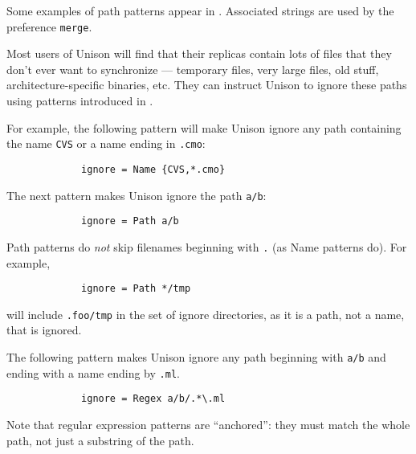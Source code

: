 \documentclass{article}
\begin{document}
Some examples of path patterns appear in .
Associated strings are used by the preference \texttt{merge}.


Most users of Unison will find that their replicas contain lots of
files that they don't ever want to synchronize --- temporary files,
very large files, old stuff, architecture-specific binaries, etc.
They can instruct Unison to ignore these paths using patterns
introduced in .

For example, the following pattern will make Unison ignore any
path containing the name \verb|CVS| or a name ending in \verb|.cmo|:
\begin{verbatim}
             ignore = Name {CVS,*.cmo}
\end{verbatim}
The next pattern makes Unison ignore the path \verb|a/b|:
\begin{verbatim}
             ignore = Path a/b
\end{verbatim}
Path patterns do {\em not} skip filenames beginning with \verb|.| (as Name
patterns do).  For example,
\begin{verbatim}
             ignore = Path */tmp
\end{verbatim}
will include \verb|.foo/tmp| in the set of ignore directories, as it is a
path, not a name, that is ignored.

The following pattern makes Unison ignore any path beginning with \verb|a/b|
and ending with a name ending by \verb|.ml|.
\begin{verbatim}
             ignore = Regex a/b/.*\.ml
\end{verbatim}
Note that regular expression patterns are ``anchored'': they must
match the whole path, not just a substring of the path.
\end{document}
